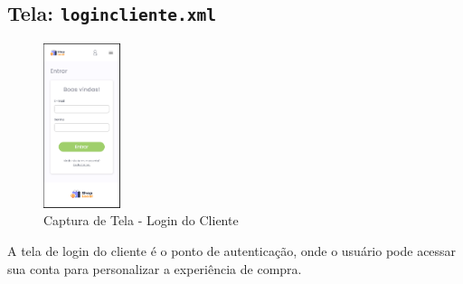 \documentclass[
	12pt,				%
	openright,			%
	twoside,			%
	a4paper,			%
	english,			%
	brazil				%
	]{abntex2}
\begin{document}
\subsection{Tela: \texttt{logincliente.xml}}

\begin{figure}[htb]
    \centering
    \includegraphics[width=0.2\textwidth]{img/logincliente}
    \caption{Captura de Tela - Login do Cliente}
\end{figure}

A tela de login do cliente é o ponto de autenticação, onde o usuário pode acessar sua conta para personalizar a experiência de compra.
\end{document}
